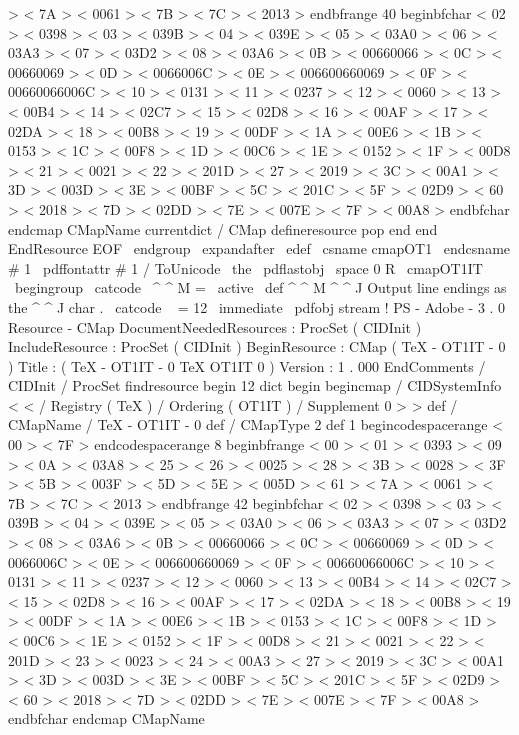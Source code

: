 {{{>
<
7A
>
<
0061
>
<
7B
>
<
7C
>
<
2013
>
endbfrange
40
beginbfchar
<
02
>
<
0398
>
<
03
>
<
039B
>
<
04
>
<
039E
>
<
05
>
<
03A0
>
<
06
>
<
03A3
>
<
07
>
<
03D2
>
<
08
>
<
03A6
>
<
0B
>
<
00660066
>
<
0C
>
<
00660069
>
<
0D
>
<
0066006C
>
<
0E
>
<
006600660069
>
<
0F
>
<
00660066006C
>
<
10
>
<
0131
>
<
11
>
<
0237
>
<
12
>
<
0060
>
<
13
>
<
00B4
>
<
14
>
<
02C7
>
<
15
>
<
02D8
>
<
16
>
<
00AF
>
<
17
>
<
02DA
>
<
18
>
<
00B8
>
<
19
>
<
00DF
>
<
1A
>
<
00E6
>
<
1B
>
<
0153
>
<
1C
>
<
00F8
>
<
1D
>
<
00C6
>
<
1E
>
<
0152
>
<
1F
>
<
00D8
>
<
21
>
<
0021
>
<
22
>
<
201D
>
<
27
>
<
2019
>
<
3C
>
<
00A1
>
<
3D
>
<
003D
>
<
3E
>
<
00BF
>
<
5C
>
<
201C
>
<
5F
>
<
02D9
>
<
60
>
<
2018
>
<
7D
>
<
02DD
>
<
7E
>
<
007E
>
<
7F
>
<
00A8
>
endbfchar
endcmap
CMapName
currentdict
/
CMap
defineresource
pop
end
end
%
%
EndResource
%
%
EOF
}
\
endgroup
\
expandafter
\
edef
\
csname
cmapOT1
\
endcsname
#
1
{
%
\
pdffontattr
#
1
{
/
ToUnicode
\
the
\
pdflastobj
\
space
0
R
}
%
}
%
%
%
\
cmapOT1IT
\
begingroup
\
catcode
\
^
^
M
=
\
active
\
def
^
^
M
{
^
^
J
}
%
Output
line
endings
as
the
^
^
J
char
.
\
catcode
\
%
=
12
\
immediate
\
pdfobj
stream
{
%
!
PS
-
Adobe
-
3
.
0
Resource
-
CMap
%
%
DocumentNeededResources
:
ProcSet
(
CIDInit
)
%
%
IncludeResource
:
ProcSet
(
CIDInit
)
%
%
BeginResource
:
CMap
(
TeX
-
OT1IT
-
0
)
%
%
Title
:
(
TeX
-
OT1IT
-
0
TeX
OT1IT
0
)
%
%
Version
:
1
.
000
%
%
EndComments
/
CIDInit
/
ProcSet
findresource
begin
12
dict
begin
begincmap
/
CIDSystemInfo
<
<
/
Registry
(
TeX
)
/
Ordering
(
OT1IT
)
/
Supplement
0
>
>
def
/
CMapName
/
TeX
-
OT1IT
-
0
def
/
CMapType
2
def
1
begincodespacerange
<
00
>
<
7F
>
endcodespacerange
8
beginbfrange
<
00
>
<
01
>
<
0393
>
<
09
>
<
0A
>
<
03A8
>
<
25
>
<
26
>
<
0025
>
<
28
>
<
3B
>
<
0028
>
<
3F
>
<
5B
>
<
003F
>
<
5D
>
<
5E
>
<
005D
>
<
61
>
<
7A
>
<
0061
>
<
7B
>
<
7C
>
<
2013
>
endbfrange
42
beginbfchar
<
02
>
<
0398
>
<
03
>
<
039B
>
<
04
>
<
039E
>
<
05
>
<
03A0
>
<
06
>
<
03A3
>
<
07
>
<
03D2
>
<
08
>
<
03A6
>
<
0B
>
<
00660066
>
<
0C
>
<
00660069
>
<
0D
>
<
0066006C
>
<
0E
>
<
006600660069
>
<
0F
>
<
00660066006C
>
<
10
>
<
0131
>
<
11
>
<
0237
>
<
12
>
<
0060
>
<
13
>
<
00B4
>
<
14
>
<
02C7
>
<
15
>
<
02D8
>
<
16
>
<
00AF
>
<
17
>
<
02DA
>
<
18
>
<
00B8
>
<
19
>
<
00DF
>
<
1A
>
<
00E6
>
<
1B
>
<
0153
>
<
1C
>
<
00F8
>
<
1D
>
<
00C6
>
<
1E
>
<
0152
>
<
1F
>
<
00D8
>
<
21
>
<
0021
>
<
22
>
<
201D
>
<
23
>
<
0023
>
<
24
>
<
00A3
>
<
27
>
<
2019
>
<
3C
>
<
00A1
>
<
3D
>
<
003D
>
<
3E
>
<
00BF
>
<
5C
>
<
201C
>
<
5F
>
<
02D9
>
<
60
>
<
2018
>
<
7D
>
<
02DD
>
<
7E
>
<
007E
>
<
7F
>
<
00A8
>
endbfchar
endcmap
CMapName
}}}
